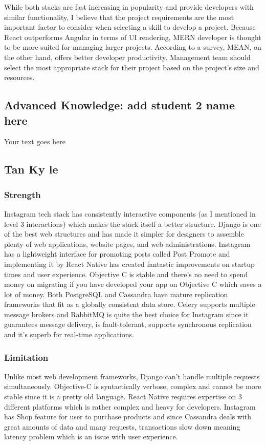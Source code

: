 \documentclass[a4paper, 11pt]{report}
\begin{document}
While both stacks are fast increasing in popularity and provide developers with similar functionality, I believe that the project requirements are the most important factor to consider when selecting a skill to develop a project. Because React outperforms Angular in terms of UI rendering, MERN developer is thought to be more suited for managing larger projects. According to a survey, MEAN, on the other hand, offers better developer productivity. \cite{isaac14} Management team should select the most appropriate stack for their project based on the project's size and resources.

\subsection{Advanced Knowledge: add student 2 name here}

Your text goes here

\subsection{Tan Ky le}

\subsubsection{Strength}
Instagram tech stack has consistently interactive components (as I mentioned in level 3 interactions) which makes the stack itself a better structure. Django is one of the best web structures and has made it simpler for designers to assemble plenty of web applications, website pages, and web administrations. Instagram has a lightweight interface for promoting posts called Post Promote and implementing it by React Native has created fantastic improvements on startup times and user experience\cite{ky8}. Objective C is stable and there’s no need to spend money on migrating if you have developed your app on Objective C which saves a lot of money. Both PostgreSQL and Cassandra have mature replication frameworks that fit as a globally consistent data store. Celery supports multiple message brokers and RabbitMQ is quite the best choice for Instagram since it guarantees message delivery, is fault-tolerant, supports synchronous replication and it’s superb for real-time applications\cite{ky9}.
\subsubsection{Limitation}
Unlike most web development frameworks, Django can’t handle multiple requests simultaneously. Objective-C is syntactically verbose, complex and cannot be more stable since it is a pretty old language. React Native requires expertise on 3 different platforms which is rather complex and heavy for developers. Instagram has Shop feature for user to purchase products and since Cassandra deals with great amounts of data and many requests, transactions slow down meaning latency problem which is an issue with user experience.
\end{document}
